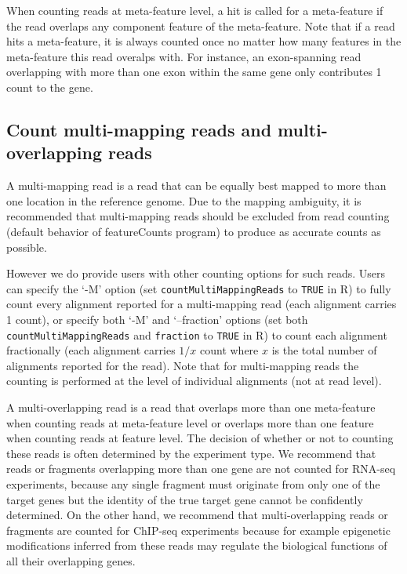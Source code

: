 \documentclass[12pt]{report}
\newcommand{\code}[1]{{\small\texttt{#1}}}
\newcommand{\featureCounts}{\textsf{featureCounts}}
\newcommand{\R}{\textsf{R}}
\begin{document}
When counting reads at meta-feature level, a hit is called for a meta-feature if the read overlaps any component feature of the meta-feature.
Note that if a read hits a meta-feature, it is always counted once no matter how many features in the meta-feature this read overalps with.
For instance, an exon-spanning read overlapping with more than one exon within the same gene only contributes 1 count to the gene.


\subsection{Count multi-mapping reads and multi-overlapping reads}

A multi-mapping read is a read that can be equally best mapped to more than one location in the reference genome.
Due to the mapping ambiguity, it is recommended that multi-mapping reads should be excluded from read counting (default behavior of {\featureCounts} program) to produce as accurate counts as possible.

However we do provide users with other counting options for such reads.
Users can specify the `-M' option (set \code{countMultiMappingReads} to \code{TRUE} in \R) to fully count every alignment reported for a multi-mapping read (each alignment carries 1 count), or specify both `-M' and `--fraction' options (set both \code{countMultiMappingReads} and \code{fraction} to \code{TRUE} in \R) to count each alignment fractionally  (each alignment carries $1/x$ count where $x$ is the total number of alignments reported for the read).
Note that for multi-mapping reads the counting is performed at the level of individual alignments (not at read level).

A multi-overlapping read is a read that overlaps more than one meta-feature when counting reads at meta-feature level or overlaps more than one feature when counting reads at feature level.
The decision of whether or not to counting these reads is often determined by the experiment type. We recommend that reads or fragments overlapping more than one gene are not counted for RNA-seq experiments, because any single fragment must originate from only one of the target genes but the identity of the true target gene cannot be confidently determined. 
On the other hand, we recommend that multi-overlapping reads or fragments are counted for ChIP-seq experiments because for example epigenetic modifications inferred from these reads may regulate the biological functions of all their overlapping genes.
\end{document}
